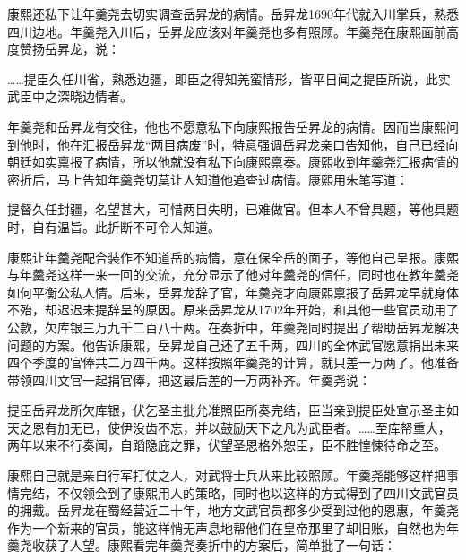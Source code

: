 
康熙还私下让年羹尧去切实调查岳昇龙的病情。岳昇龙1690年代就入川掌兵，熟悉四川边地。年羹尧入川后，岳昇龙应该对年羹尧也多有照顾。年羹尧在康熙面前高度赞扬岳昇龙，说：



\begin{bookquote}……提臣久任川省，熟悉边疆，即臣之得知羌蛮情形，皆平日闻之提臣所说，此实武臣中之深晓边情者。\end{bookquote}


年羹尧和岳昇龙有交往，他也不愿意私下向康熙报告岳昇龙的病情。因而当康熙问到他时，他在汇报岳昇龙“两目病废”时，特意强调岳昇龙亲口告知他，自己已经向朝廷如实禀报了病情，所以他就没有私下向康熙禀奏。康熙收到年羹尧汇报病情的密折后，马上告知年羹尧切莫让人知道他追查过病情。康熙用朱笔写道：



\begin{bookquote}提督久任封疆，名望甚大，可惜两目失明，已难做官。但本人不曾具题，等他具题时，自有温旨。此折断不可令人知道。\end{bookquote}


康熙让年羹尧配合装作不知道岳的病情，意在保全岳的面子，等他自己呈报。康熙与年羹尧这样一来一回的交流，充分显示了他对年羹尧的信任，同时也在教年羹尧如何平衡公私人情。后来，岳昇龙辞了官，年羹尧才向康熙禀报了岳昇龙早就身体不殆，却迟迟未提辞呈的原因。原来岳昇龙从1702年开始，和其他一些官员动用了公款，欠库银三万九千二百八十两。在奏折中，年羹尧同时提出了帮助岳昇龙解决问题的方案。他告诉康熙，岳昇龙自己还了五千两，四川的全体武官愿意捐出未来四个季度的官俸共二万四千两。这样按照年羹尧的计算，就只差一万两了。他准备带领四川文官一起捐官俸，把这最后差的一万两补齐。年羹尧说：



\begin{bookquote}提臣岳昇龙所欠库银，伏乞圣主批允准照臣所奏完结，臣当亲到提臣处宣示圣主如天之恩有加无已，使伊没齿不忘，并以鼓励天下之凡为武臣者。……至库帑重大，两年以来不行奏闻，自蹈隐庇之罪，伏望圣恩格外恕臣，臣不胜惶悚待命之至。\end{bookquote}


康熙自己就是亲自行军打仗之人，对武将士兵从来比较照顾。年羹尧能够这样把事情完结，不仅领会到了康熙用人的策略，同时也以这样的方式得到了四川文武官员的拥戴。岳昇龙在蜀经营近二十年，地方文武官员都多少受到过他的恩惠，年羹尧作为一个新来的官员，能这样悄无声息地帮他们在皇帝那里了却旧账，自然也为年羹尧收获了人望。康熙看完年羹尧奏折中的方案后，简单批了一句话：


